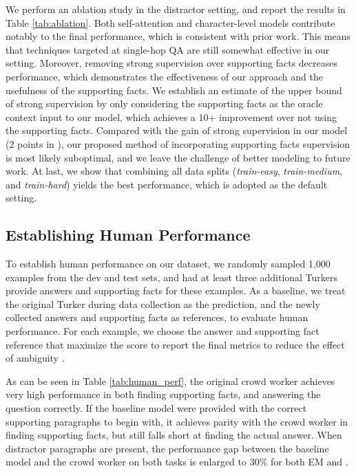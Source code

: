 We perform an ablation study in the distractor setting, and report the results in Table \ref{tab:ablation}.
Both self-attention and character-level models contribute notably to the final performance, which is consistent with prior work.
This means that techniques targeted at single-hop QA are still somewhat effective in our setting.
Moreover, removing strong supervision over supporting facts decreases performance, which demonstrates the effectiveness of our approach and the usefulness of the supporting facts.
We establish an estimate of the upper bound of strong supervision by only considering the supporting facts as the oracle context input to our model, which achieves a 10+ \fone{} improvement over not using the supporting facts.
Compared with the gain of strong supervision in our model (2 points in \fone{}), our proposed method of incorporating supporting facts supervision is most likely suboptimal, and we leave the challenge of better modeling to future work.
At last, we show that combining all data splits (\textit{train-easy}, \textit{train-medium}, and \textit{train-hard}) yields the best performance, which is adopted as the default setting.



\subsection{Establishing Human Performance} \label{sec:human}

To establish human performance on our dataset, we randomly sampled 1,000 examples from the dev and test sets, and had at least three additional Turkers provide answers and supporting facts for these examples.
As a baseline, we treat the original Turker during data collection as the prediction, and the newly collected answers and supporting facts as references, to evaluate human performance.
For each example, we choose the answer and supporting fact reference that maximize the \fone{} score to report the final metrics to reduce the effect of ambiguity \cite{rajpurkar2016squad}.

As can be seen in Table \ref{tab:human_perf}, the original crowd worker achieves very high performance in both finding supporting facts, and answering the question correctly.
If the baseline model were provided with the correct supporting paragraphs to begin with, it achieves parity with the crowd worker in finding supporting facts, but still falls short at finding the actual answer.
When distractor paragraphs are present,  the performance gap between the baseline model and the crowd worker on both tasks is enlarged to 30\% for both EM and \fone{}.

